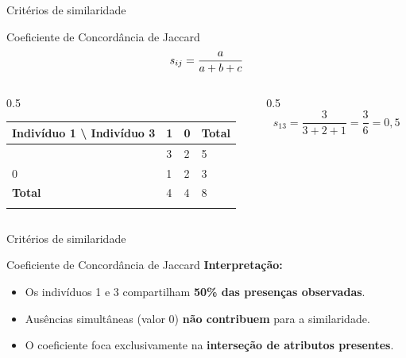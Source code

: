 \documentclass[
  ignorenonframetext,
  aspectratio=169,
]{beamer}
\newcounter{none} %
\providecommand{\tightlist}{%
  \setlength{\itemsep}{0pt}\setlength{\parskip}{0pt}}
\begin{document}
\begin{frame}{Critérios de similaridade}
\protect{}\label{crituxe9rios-de-similaridade-4}
\begin{block}{Coeficiente de Concordância de Jaccard}
\protect{}\label{coeficiente-de-concorduxe2ncia-de-jaccard}
\[\Large s_{ij} = \displaystyle{\frac{a}{a + b + c}}\]

\begin{columns}[T]
\begin{column}{0.5\linewidth}
{\def\LTcaptype{none} %
\begin{longtable}[]{@{}llll@{}}
\toprule\noalign{}
Indivíduo 1 \textbackslash{} Indivíduo 3 & 1 & 0 & Total \\
\midrule\noalign{}
\endhead
1 & 3 & 2 & 5 \\
0 & 1 & 2 & 3 \\
\textbf{Total} & 4 & 4 & 8 \\
\bottomrule\noalign{}
\end{longtable}
}
\end{column}

\begin{column}{0.5\linewidth}
\[
s_{13} = \dfrac{3}{3 + 2 + 1}
       = \dfrac{3}{6}
       = 0,5
\]
\end{column}
\end{columns}
\end{block}
\end{frame}

\begin{frame}{Critérios de similaridade}
\protect{}\label{crituxe9rios-de-similaridade-5}
\begin{block}{Coeficiente de Concordância de Jaccard}
\protect{}\label{coeficiente-de-concorduxe2ncia-de-jaccard-1}
\textbf{Interpretação:}

\begin{itemize}
\tightlist
\item
  Os indivíduos 1 e 3 compartilham \textbf{50\% das presenças
  observadas}.
\item
  Ausências simultâneas (valor 0) \textbf{não contribuem} para a
  similaridade.
\item
  O coeficiente foca exclusivamente na \textbf{interseção de atributos
  presentes}.
\end{itemize}
\end{block}
\end{frame}
\end{document}
